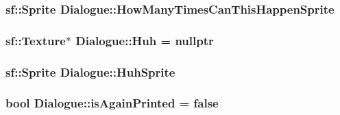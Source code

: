 \subsubsection[{\texorpdfstring{How\+Many\+Times\+Can\+This\+Happen\+Sprite}{HowManyTimesCanThisHappenSprite}}]{\setlength{\rightskip}{0pt plus 5cm}sf\+::\+Sprite Dialogue\+::\+How\+Many\+Times\+Can\+This\+Happen\+Sprite\hspace{0.3cm}{\ttfamily [protected]}}\hypertarget{classDialogue_a1a895aadcac2ff23681623c889b7f131}{}\label{classDialogue_a1a895aadcac2ff23681623c889b7f131}
\subsubsection[{\texorpdfstring{Huh}{Huh}}]{\setlength{\rightskip}{0pt plus 5cm}sf\+::\+Texture$\ast$ Dialogue\+::\+Huh = nullptr\hspace{0.3cm}{\ttfamily [protected]}}\hypertarget{classDialogue_a20a28f958cc46b2cf20de4d448a68cba}{}\label{classDialogue_a20a28f958cc46b2cf20de4d448a68cba}
\subsubsection[{\texorpdfstring{Huh\+Sprite}{HuhSprite}}]{\setlength{\rightskip}{0pt plus 5cm}sf\+::\+Sprite Dialogue\+::\+Huh\+Sprite\hspace{0.3cm}{\ttfamily [protected]}}\hypertarget{classDialogue_ae6af9a5ea9b38c71cf31cfef5c213e39}{}\label{classDialogue_ae6af9a5ea9b38c71cf31cfef5c213e39}
\subsubsection[{\texorpdfstring{is\+Again\+Printed}{isAgainPrinted}}]{\setlength{\rightskip}{0pt plus 5cm}bool Dialogue\+::is\+Again\+Printed = false\hspace{0.3cm}{\ttfamily [protected]}}\hypertarget{classDialogue_a156b482fc8d9ec868117e0ff1e111325}{}\label{classDialogue_a156b482fc8d9ec868117e0ff1e111325}
